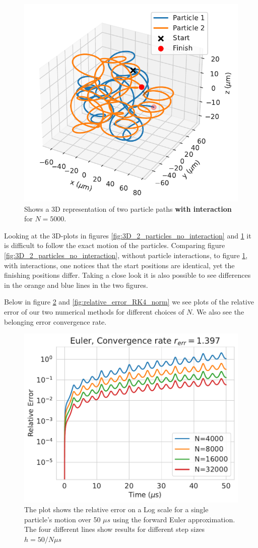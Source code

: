 \documentclass[english,notitlepage,reprint,nofootinbib]{revtex4-1}  %
\begin{document}
\begin{figure}[H]
    \centering
    \includegraphics[width=.5\textwidth]{../figures/3D_2_particles_RK4_interaction_N5000.pdf}
    \caption{Shows a 3D representation of two particle paths \textbf{with interaction} for $N = 5000$.}
    \label{fig:3D_2_particles_with_interaction}
\end{figure}
Looking at the 3D-plots in figures \ref{fig:3D_2_particles_no_interaction} and \ref{fig:3D_2_particles_with_interaction}
it is difficult to follow the exact motion of the particles. Comparing figure \ref{fig:3D_2_particles_no_interaction}, without
particle interactions, to figure \ref{fig:3D_2_particles_with_interaction}, with interactions, one notices that the start positions
are identical, yet the finishing positions differ. Taking a close look it is also possible to see differences in the orange and blue
lines in the two figures.

Below in figure \ref{fig:relative_error_Euler_norm} and \ref{fig:relative_error_RK4_norm} we see plots of the relative error of our two numerical methods for different choices of $N$. We also see the belonging error convergence rate.
\begin{figure}[H]
    \centering
    \includegraphics[width=.5\textwidth]{../figures/relative_error_Euler_norm.pdf}
    \caption{The plot shows the relative error on a Log scale for a single particle's motion over 50 $\mu s$ using the forward Euler approximation.
        The four different lines show results for different step sizes $h = 50/N \mu s$ }
    \label{fig:relative_error_Euler_norm}
\end{figure}
\end{document}
